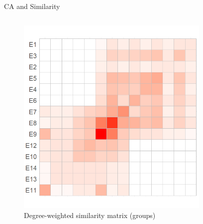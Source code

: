 \documentclass[
  ignorenonframetext,
]{beamer}
\begin{document}
\begin{frame}{CA and Similarity}
\protect\hypertarget{ca-and-similarity-3}{}
\begin{columns}[T]
\begin{column}{0.5\textwidth}
\begin{figure}

{\centering \includegraphics{Plots/ca-sim-g.png}

}

\caption{Degree-weighted similarity matrix (groups)}

\end{figure}
\end{column}

\begin{column}{0.5\textwidth}
\begin{figure}


\end{figure}
\end{column}
\end{columns}
\end{frame}
\end{document}
